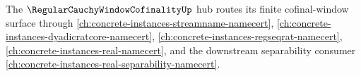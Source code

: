 The $\RegularCauchyWindowCofinalityUp$ hub routes its finite cofinal-window surface through \autoref{ch:concrete-instances-streamname-namecert}, \autoref{ch:concrete-instances-dyadicratcore-namecert}, \autoref{ch:concrete-instances-regseqrat-namecert}, \autoref{ch:concrete-instances-real-namecert}, and the downstream separability consumer \autoref{ch:concrete-instances-real-separability-namecert}.





